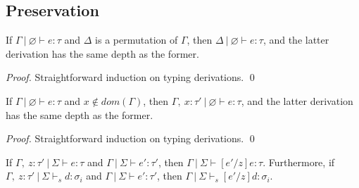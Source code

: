 \documentclass{llncs}
\begin{document}
\subsection{Preservation}

\begin{lemma}[Permutation]
If $\Gamma~|~\varnothing \vdash e : \tau$ and $\Delta$ is a permutation of $\Gamma$, then $\Delta~|~\varnothing \vdash e : \tau$, and the latter derivation has the same depth as the former.
\end{lemma}

\begin{proof}
Straightforward induction on typing derivations. \qed
\end{proof}

\vspace{6pt}

\begin{lemma}[Weakening]
If $\Gamma~|~\varnothing \vdash e : \tau$ and $x \not\in dom(\Gamma)$, then $\Gamma,~x : \tau'~|~\varnothing \vdash e : \tau$, and the latter derivation has the same depth as the former.
\end{lemma}

\begin{proof}
Straightforward induction on typing derivations. \qed
\end{proof}

\vspace{6pt}

\begin{lemma}
If $\Gamma,~z : \tau'~|~\Sigma \vdash e : \tau$ and $\Gamma~|~\Sigma \vdash e' : \tau'$, then $\Gamma~|~\Sigma \vdash [e'/z]e : \tau$. Furthermore, if $\Gamma,~z : \tau'~|~\Sigma \vdash_s d : \sigma_i$ and $\Gamma~|~\Sigma \vdash e' : \tau'$, then $\Gamma~|~\Sigma \vdash_s [e'/z]d : \sigma_i$.
\end{lemma}
\end{document}
